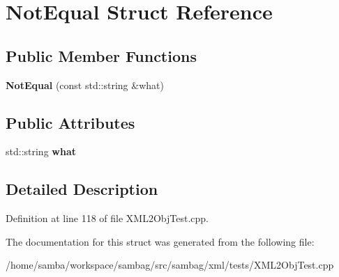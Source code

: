 \hypertarget{struct_not_equal}{
\section{NotEqual Struct Reference}
\label{struct_not_equal}
}
\subsection*{Public Member Functions}
\begin{DoxyCompactItemize}
\item 
\hypertarget{struct_not_equal_a71acb1cc5a8ebf8ce1c32cba0f6d9d10}{
{\bfseries NotEqual} (const std::string \&what)}
\label{struct_not_equal_a71acb1cc5a8ebf8ce1c32cba0f6d9d10}

\end{DoxyCompactItemize}
\subsection*{Public Attributes}
\begin{DoxyCompactItemize}
\item 
\hypertarget{struct_not_equal_a9d7ee077a6548cfb499c61f13f7fa777}{
std::string {\bfseries what}}
\label{struct_not_equal_a9d7ee077a6548cfb499c61f13f7fa777}

\end{DoxyCompactItemize}


\subsection{Detailed Description}


Definition at line 118 of file XML2ObjTest.cpp.



The documentation for this struct was generated from the following file:\begin{DoxyCompactItemize}
\item 
/home/samba/workspace/sambag/src/sambag/xml/tests/XML2ObjTest.cpp\end{DoxyCompactItemize}
